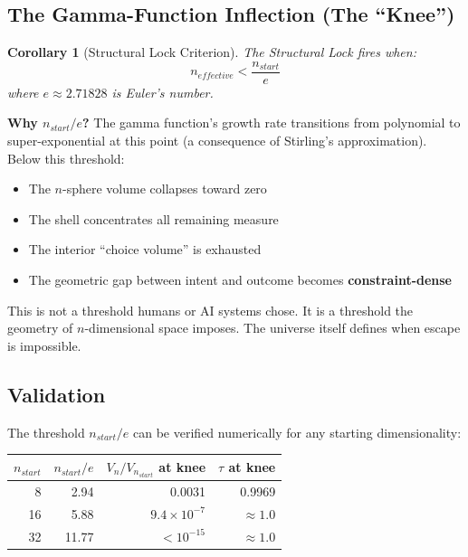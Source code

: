 \documentclass[11pt, a4paper]{article}
\newtheorem{corollary}{Corollary}[section]
\begin{document}
\subsection{The Gamma-Function Inflection (The ``Knee'')}

\begin{corollary}[Structural Lock Criterion]
The Structural Lock fires when:
\begin{equation}
  n_{effective} < \frac{n_{start}}{e}
  \label{eq:knee}
\end{equation}
where $e \approx 2.71828$ is Euler's number.
\end{corollary}

\textbf{Why $n_{start}/e$?} The gamma function's growth rate transitions
from polynomial to super-exponential at this point (a consequence of
Stirling's approximation). Below this threshold:
\begin{itemize}[nosep]
  \item The $n$-sphere volume collapses toward zero
  \item The shell concentrates all remaining measure
  \item The interior ``choice volume'' is exhausted
  \item The geometric gap between intent and outcome becomes
        \textbf{constraint-dense}
\end{itemize}

This is not a threshold humans or AI systems chose. It is a threshold the
geometry of $n$-dimensional space imposes. The universe itself defines when
escape is impossible.

\subsection{Validation}

The threshold $n_{start}/e$ can be verified numerically for any starting
dimensionality:

\begin{center}
\begin{tabular}{@{}rrrr@{}}
\toprule
$n_{start}$ & $n_{start}/e$ & $V_n/V_{n_{start}}$ at knee & $\tau$ at knee \\
\midrule
8  & 2.94 & 0.0031 & 0.9969 \\
16 & 5.88 & $9.4 \times 10^{-7}$ & $\approx 1.0$ \\
32 & 11.77 & $< 10^{-15}$ & $\approx 1.0$ \\
\bottomrule
\end{tabular}
\end{center}
\end{document}
